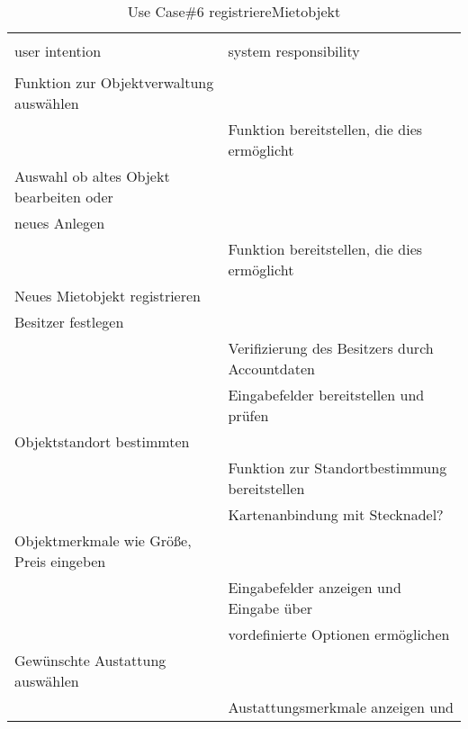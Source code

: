 \begin{table}[H]
\caption{Use Case\#6 registriereMietobjekt }
\centering
\begin{tabular}{l l}
\\ [-0.5ex]

\hline\hline
\\ [-0.5ex]
user intention & system responsibility
\\ [1.5ex]
\hline
\\ [-0.5ex]
Funktion zur Objektverwaltung auswählen      &                                   \\[1ex]
                                 & Funktion bereitstellen, die dies ermöglicht   \\[1ex]
Auswahl ob altes Objekt bearbeiten oder      &                                   \\[1ex]
neues Anlegen                          &                                   \\[1ex]
                                 & Funktion bereitstellen, die dies ermöglicht   \\[1ex]
Neues Mietobjekt registrieren          &                                   \\[1ex] 
Besitzer festlegen                     &                                   \\[1ex] 
                                 & Verifizierung des Besitzers durch Accountdaten \\[1ex]
                                 & Eingabefelder bereitstellen und prüfen     \\[1ex]
Objektstandort bestimmten              &                                   \\[1ex]
                                 & Funktion zur Standortbestimmung bereitstellen  \\[1ex] 
                                 & Kartenanbindung mit Stecknadel?              \\[1ex]   
Objektmerkmale wie Größe, Preis eingeben  &                                   \\[1ex]
                                 & Eingabefelder anzeigen und Eingabe über       \\[1ex]
                                 & vordefinierte Optionen ermöglichen         \\[1ex]
Gewünschte Austattung auswählen           &                                   \\[1ex]
                                 & Austattungsmerkmale anzeigen und           \\[1ex]

\end{tabular}
\end{table}
